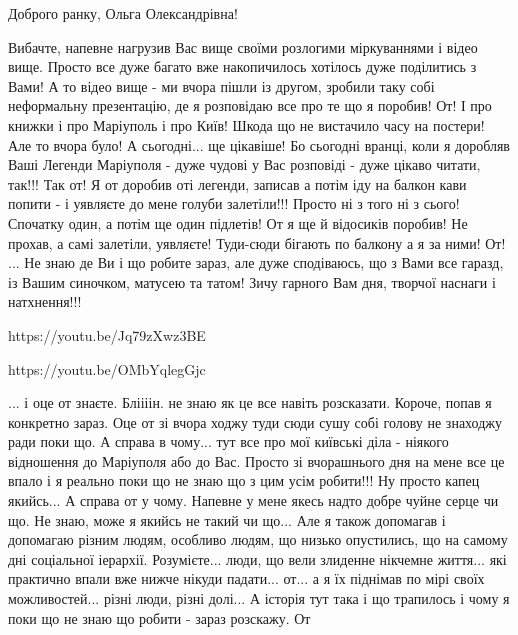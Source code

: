  
 
 
 
 

Доброго ранку, Ольга Олександрівна!

Вибачте, напевне нагрузив Вас вище своїми розлогими міркуваннями і відео вище.
Просто все дуже багато вже накопичилось хотілось дуже поділитись з Вами! А то відео вище - ми
вчора пішли із другом, зробили таку собі неформальну презентацію, де я
розповідаю все про те що я поробив! От! І про книжки і про Маріуполь і про
Київ! Шкода що не вистачило часу на постери! Але то вчора було! А сьогодні...
ще цікавіше!  Бо сьогодні вранці, коли я доробляв Ваші Легенди Маріуполя - дуже
чудові у Вас розповіді - дуже цікаво читати, так!!!  Так от! Я от доробив оті
легенди, записав а потім іду на балкон кави попити - і
уявляєте до мене голуби залетіли!!!  Просто ні з того ні з сього! Спочатку
один, а потім ще один підлетів! От я ще й відосиків поробив!  Не прохав, а самі
залетіли, уявляєте! Туди-сюди бігають по балкону а я за ними! От! ... Не знаю де Ви
і що робите зараз, але дуже сподіваюсь, що з Вами все гаразд, із Вашим
синочком, матусею та татом! Зичу гарного Вам дня, творчої наснаги і
натхнення!!!

https://youtu.be/Jq79zXwz3BE

https://youtu.be/OMbYqlegGjc

... і оце от знаєте. Бліііін. не знаю як це все навіть розсказати. Короче, попав я
конкретно зараз. Оце от зі вчора ходжу туди сюди сушу собі голову не знаходжу
ради поки що. А справа в чому...  тут все про мої київські діла - ніякого
відношення до Маріуполя або до Вас. Просто зі вчорашнього дня на мене все це
впало і я реально поки що не знаю що з цим усім робити!!! Ну просто капец
якийсь... А справа от у чому. Напевне у мене якесь надто добре чуйне серце чи
що. Не знаю, може я якийсь не такий чи що... Але я також допомагав і допомагаю
різним людям, особливо людям, що низько опустились, що на самому дні соціальної
іерархії. Розумієте... люди, що вели злиденне нікчемне життя... які практично
впали вже нижче нікуди падати...  от... а я їх піднімав по мірі своїх
можливостей...  різні люди, різні долі...      А історія тут така і що
трапилось і чому я поки що не знаю що робити - зараз розскажу. От
